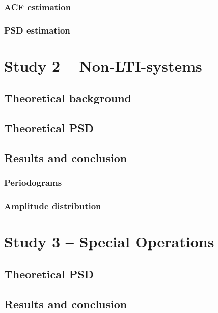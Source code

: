 \documentclass[10pt]{article}
\begin{document}
\subsubsection{ACF estimation}


\subsubsection{PSD estimation}


\section{Study 2 – Non-LTI-systems}

\subsection{Theoretical background}

\subsection{Theoretical PSD}


\subsection{Results and conclusion}

\subsubsection{Periodograms}


\subsubsection{Amplitude distribution}


\section{Study 3 – Special Operations}


\subsection{Theoretical PSD}


\subsection{Results and conclusion}
\end{document}
